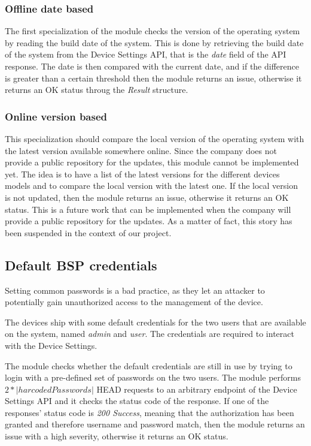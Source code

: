 \subsubsection{Offline date based}

The first specialization of the module checks the version of the operating system by reading the build date of the system. This is done by retrieving the build date of the system from the Device Settings API, that is the \textit{date} field of the API response. The date is then compared with the current date, and if the difference is greater than a certain threshold then the module returns an issue, otherwise it returns an OK status throug the \textit{Result} structure.

\subsubsection{Online version based}

This specialization should compare the local version of the operating system with the latest version available somewhere online. Since the company does not provide a public repository for the updates, this module cannot be implemented yet. The idea is to have a list of the latest versions for the different devices models and to compare the local version with the latest one. If the local version is not updated, then the module returns an issue, otherwise it returns an OK status. This is a future work that can be implemented when the company will provide a public repository for the updates. As a matter of fact, this story has been suspended in the context of our project.

\subsection{Default BSP credentials}

Setting common passwords is a bad practice, as they let an attacker to potentially gain unauthorized access to the management of the device.

The devices ship with some default credentials for the two users that are available on the system, named \textit{admin} and \textit{user}. The credentials are required to interact with the Device Settings.

The module checks whether the default credentials are still in use by trying to login with a pre-defined set of passwords on the two users. The module performs $2*|harcodedPasswords|$ HEAD requests to an arbitrary endpoint of the Device Settings API and it checks the status code of the response. If one of the responses' status code is \textit{200 Success}, meaning that the authorization has been granted and therefore username and password match, then the module returns an issue with a high severity, otherwise it returns an OK status.

